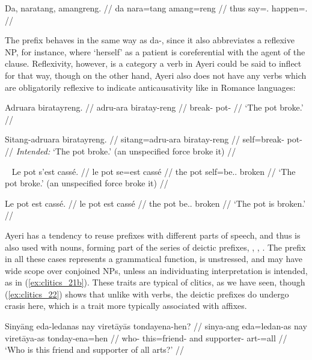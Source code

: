 \ex\label{ex:clitics_18}\begingl
	\gla Da, naratang, amangreng. //
	\glb da nara=tang amang=reng //
	\glc thus say=\TplM{}.\Aarg{} happen=\TsgI{}.\Aarg{} //
\endgl\xe

The prefix  behaves in the same way as 
{da-}, since it also abbreviates a reflexive NP, for instance,
 where `herself' as a patient is
coreferential with the agent of the clause. Reflexivity, however, is a category
a verb in Ayeri could be said to inflect for that way, though on the other
hand, Ayeri also does not have any verbs which are obligatorily reflexive to
indicate anticausativity like in Romance languages:

\pex\label{ex:clitics_19}
\a\label{ex:clitics_19a}\begingl
	\gla Adruara biratayreng. //
	\glb adru-ara biratay-reng //
	\glc break-\TsgI{} pot-\AargI{} //
	\glft `The pot broke.' //
\endgl

\a\label{ex:clitics_19b}\ljudge{*}\begingl
	\gla Sitang-adruara biratayreng. //
	\glb sitang=adru-ara biratay-reng //
	\glc self=break-\TsgI{} pot-\AargI{} //
	\glft \textit{Intended:} `The pot broke.' (an unspecified force broke it) //
\endgl
\xe

\pex~\label{ex:clitics_20}
\a\label{ex:clitics_20a}\begingl{}%
	\gla Le pot s'est cassé. //
	\glb le pot se=est cassé //
	\glc the pot self=be.\Tsg{}.\Prs{} broken //
	\glft `The pot broke.' (an unspecified force broke it) //
\endgl

\a\label{ex:clitics_20b}\begingl
	\gla Le pot est cassé. //
	\glb le pot est cassé //
	\glc the pot be.\Tsg{}.\Prs{} broken //
	\glft `The pot is broken.' //
\endgl
\xe

Ayeri has a tendency to reuse prefixes with different parts of speech, and thus
 is also used with nouns, forming part of the series of deictic
prefixes, , ,
. The prefix in all these cases represents a grammatical
function, is unstressed, and may have wide scope over conjoined NPs, unless an
individuating interpretation is intended, as in (\ref{ex:clitics_21b}). These
traits are typical of clitics, as we have seen, though (\ref{ex:clitics_22})
shows that unlike with verbs, the deictic prefixes do undergo crasis here, 
which is a trait more typically associated with affixes.

\pex\label{ex:clitics_21}
\a\label{ex:clitics_21a}\begingl
	\gla Sinyāng eda-ledanas nay viretāyās tondayena-hen? //
	\glb sinya-ang eda=ledan-as nay viretāya-as tonday-ena=hen //
	\glc who-\Aarg{} this=friend-\Parg{} and supporter-\Parg{} 
		art-\Gen{}=all //
	\glft `Who is this friend and supporter of all arts?' //
\endgl

